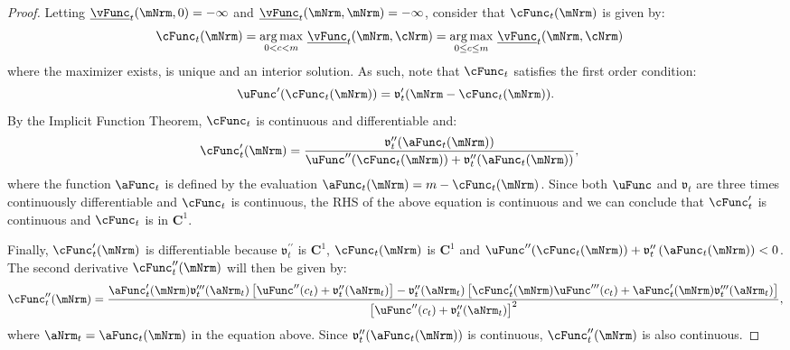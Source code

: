 \documentclass[\econtexRoot/BufferStockTheory]{subfiles}
\begin{document}
\begin{proof}
Letting $\underline{\vFunc}_{t}(\mNrm,0) = -\infty$ and  $\underline{\vFunc}_{t}(\mNrm,\mNrm) = -\infty$,  consider that $\cFunc_{t}(\mNrm)$ is given by:
%
\begin{equation*}\begin{gathered}\begin{aligned}
      \cFunc_{t}(\mNrm)  & = \underset{0<c<m}{\arg \max }~\underline{\vFunc}_{t}(\mNrm,\cNrm)= \underset{0\leq c \leq m}{\arg \max }~\underline{\vFunc}_{t}(\mNrm,\cNrm)
    \end{aligned}\end{gathered}\end{equation*}
where the maximizer exists, is unique and an interior solution. As such, note that $\cFunc_{t}$ satisfies the first order condition:
%
\begin{equation*}\label{eq:uprimcFOC}
  \uFunc^{\prime }(\cFunc_{t}(\mNrm))=\mathfrak{v}_{t}^{\prime }(\mNrm-\cFunc_{t}(\mNrm)).
\end{equation*}
%
By the Implicit Function Theorem, $\cFunc_{t}$ is continuous and differentiable and:
%
\begin{equation*}\label{eq:derivativeConsFunc}\begin{gathered}\begin{aligned}
      \cFunc_{t}^{\prime }(\mNrm)  & = \frac{\mathfrak{v}_{t}^{\prime \prime }({\aFunc}_{t}(\mNrm))  }{\uFunc^{\prime \prime }(\cFunc_{t}(\mNrm))+\mathfrak{v}_{t}^{\prime \prime }({\aFunc}_{t}(\mNrm))},
    \end{aligned}\end{gathered}\end{equation*}
%
where the function $\aFunc_{t}$ is defined by the evaluation $\aFunc_{t}(\mNrm) = m- \cFunc_{t}(\mNrm)$. Since both $\uFunc$ and $\mathfrak{v}_{t}$ are
three times continuously differentiable and $\cFunc_{t}$ is continuous, the RHS of the above equation is continuous and we can conclude that
$\cFunc_{t}^{\prime }$ is continuous and $\cFunc_{t}$ is in $\mathbf{C}^{1}$.

Finally, $\cFunc_{t}^{\prime }(\mNrm)$ is differentiable because
$\mathfrak{v}_{t}^{\prime \prime }$ is $\mathbf{C}^{1}$, $ \cFunc_{t}(\mNrm)$
is $\mathbf{C}^{1}$ and $\uFunc^{\prime \prime
}(\cFunc_{t}(\mNrm))+\mathfrak{v}_{t}^{\prime \prime }\left( {\aFunc}_{t}(\mNrm)\right)
<0$.
The second derivative $\cFunc_{t}^{\prime \prime }(\mNrm)$ will then be given by:
%
\begin{equation*}
  \cFunc_{t}^{\prime \prime }(\mNrm)=\frac{{\aFunc}_{t}^{\prime }(\mNrm)\mathfrak{v}_{t}^{\prime \prime
      \prime }({\aNrm}_{t})\left[ \uFunc^{\prime \prime }(c_{t})+\mathfrak{v}_{t}^{\prime \prime }({\aNrm}_{t})
    \right] -\mathfrak{v}_{t}^{\prime \prime }({\aNrm}_{t})\left[ \cFunc_{t}^{\prime }(\mNrm)\uFunc^{\prime \prime
        \prime }(c_{t})+{\aFunc}_{t}^{\prime }(\mNrm)\mathfrak{v}_{t}^{\prime \prime \prime }({\aNrm}_{t})\right] }{
    {\left[ \uFunc^{\prime \prime }(c_{t})+\mathfrak{v}_{t}^{\prime \prime }({\aNrm}_{t})\right]}^{2}},
\end{equation*}
%
where $\aNrm_{t} = \aFunc_{t}(\mNrm)$ in the equation above. Since $\mathfrak{v}_{t}^{\prime \prime }({\aFunc}_{t}(\mNrm))$ is continuous,
$\cFunc_{t}^{\prime \prime }(\mNrm)$ is also continuous.


\end{proof}
\end{document}
